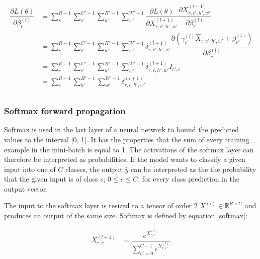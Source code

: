\documentclass[a4paper,11pt,twoside]{article}
\newcommand*{\pd}[2]{\ensuremath{\dfrac{\partial #1}{\partial #2}}}
\begin{document}
\begin{align}
\begin{split}
	\pd{L(\theta)}{\beta^{(l)}_{c}}
		& = \sum^{R-1}_{r} \sum^{C'-1}_{c'} \sum^{H'-1}_{h'} \sum^{W'-1}_{w'} \pd{L(\theta)}{X^{(l+1)}_{r,c',h',w'}} \pd{X^{(l+1)}_{r,c',h',w'}}{\beta^{(l)}_{c}} \\
		& = \sum^{R-1}_{r} \sum^{C'-1}_{c'} \sum^{H'-1}_{h'} \sum^{W'-1}_{w'} \delta^{(l+1)}_{r,c',h',w'}  \pd{({\gamma_{c'}^{(l)} \hat{X}_{r,c',h',w'} + \beta_{c'}^{(l)}})}{\beta^{(l)}_{c}} \\
		& = \sum^{R-1}_{r} \sum^{C'-1}_{c'} \sum^{H'-1}_{h'} \sum^{W'-1}_{w'} \delta^{(l+1)}_{r,c,h',w'} I_{c',c}\\
		& = \sum^{R-1}_{r} \sum^{H'-1}_{h'} \sum^{W'-1}_{w'} \delta^{(l+1)}_{r,c,h',w'} \\
\end{split}
\end{align}

\subsubsection{Softmax forward propagation}
Softmax is used in the last layer of a neural network to bound the predicted values to the interval [0, 1]. It has the properties that the sum of every training example in the mini-batch is equal to 1. The activations of the softmax layer can therefore be interpreted as probabilities. If the model wants to classify a given input into one of $C$ classes, the output $\hat{y}$ can be interpreted as the the probability that the given input is of class $c$; $0 \leq c \leq C$, for every class prediction in the output vector. \cite{cs231n}

The input to the softmax layer is resized to a tensor of order 2 $X^{(l)} \in \mathbb{R}^{R \times C}$ and produces an output of the same size. Softmax is defined by equation \eqref{softmax}: \cite{cs231n}

\begin{equation}\label{softmax}
\begin{split}
X^{(l+1)}_{r,c}
	& = \dfrac{e^{X^{(l)}_{r,c}}}{\sum^{C-1}_{c'=0}e^{X^{(l)}_{r,c'}}} \\
\end{split}
\end{equation}
\end{document}
